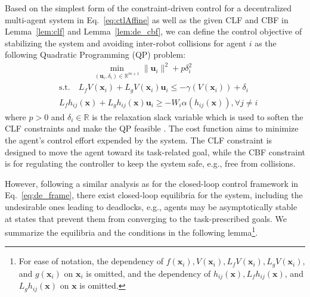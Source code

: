 \documentclass[letterpaper, 10 pt, conference]{ieeeconf}
\theoremstyle{plain}
\begin{document}
Based on the simplest form of the constraint-driven control \cite{ames2014control, notomista2022resilience} for a decentralized multi-agent system in Eq.~\eqref{eq:ctlAffine} as well as the given CLF and CBF in Lemma~\ref{lem:clf} and Lemma~\ref{lem:de_cbf}, we can define the control objective of stabilizing the system and avoiding inter-robot collisions for agent $i$ as the following Quadratic Programming (QP) problem:
\begin{align} \label{eq:de_frame}
& \qquad \qquad \min _{(\mathbf{u}_i,\delta_i)\in \mathbb {R}^{m+1}} \| {\mathbf{u}_i} \|^{2} + p \delta_i ^{2}\\
&\mathrm{s}.\mathrm{t}.\quad  L_{f} V(\mathbf{x}_i) + L_{g} V(\mathbf{x}_i) \mathbf{u}_i \le -\gamma (V(\mathbf{x}_i)) +  \delta_i \tag{CLF} \\ 
& L_{f} h_{ij}(\mathbf{x}) + L_{g} h_{ij}(\mathbf{x}) \mathbf{u}_i \ge - W_{i} \alpha (h_{ij}(\mathbf{x})), \forall j \neq i \tag{CBF}
\end{align}
where $p > 0$ and $\delta_i \in \mathbb{R}$ is the relaxation slack variable which is used to soften the CLF constraints and make the QP feasible \cite{reis2020control}. The cost function aims to minimize the agent's control effort expended by the system. The CLF constraint is designed to move the agent toward its task-related goal, while the CBF constraint is for regulating
the
controller to keep the system safe, e.g., free from collisions.


However, following a similar analysis as \cite{reis2020control} for the closed-loop control framework in Eq.~\eqref{eq:de_frame}, there exist closed-loop equilibria for the system, including the undesirable ones leading to deadlocks, e.g., agents may be asymptotically stable at states that prevent them from converging to the task-prescribed goals. We summarize the equilibria and the conditions in the following lemma\footnote{For ease of notation, the dependency of $f(\mathbf{x}_i), V(\mathbf{x}_i), L_fV(\mathbf{x}_i), L_gV(\mathbf{x}_i)$, and $g(\mathbf{x}_i)$ on $\mathbf{x}_i$ is omitted, and the dependency of
$h_{ij}(\mathbf{x}), L_fh_{ij}(\mathbf{x})$, and
$L_gh_{ij}(\mathbf{x})$ on $\mathbf{x}$ is omitted.}.
\end{document}
